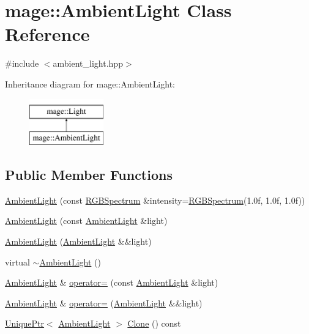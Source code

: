\hypertarget{classmage_1_1_ambient_light}{}\section{mage\+:\+:Ambient\+Light Class Reference}
\label{classmage_1_1_ambient_light}


{\ttfamily \#include $<$ambient\+\_\+light.\+hpp$>$}

Inheritance diagram for mage\+:\+:Ambient\+Light\+:\begin{figure}[H]
\begin{center}
\leavevmode
\includegraphics[height=2.000000cm]{classmage_1_1_ambient_light}
\end{center}
\end{figure}
\subsection*{Public Member Functions}
\begin{DoxyCompactItemize}
\item 
\hyperlink{classmage_1_1_ambient_light_a4ae1590d03ca4e9d854bb6ef650ee126}{Ambient\+Light} (const \hyperlink{structmage_1_1_r_g_b_spectrum}{R\+G\+B\+Spectrum} \&intensity=\hyperlink{structmage_1_1_r_g_b_spectrum}{R\+G\+B\+Spectrum}(1.\+0f, 1.\+0f, 1.\+0f))
\item 
\hyperlink{classmage_1_1_ambient_light_ac5295d1f90e64d3e59ff2856df32a187}{Ambient\+Light} (const \hyperlink{classmage_1_1_ambient_light}{Ambient\+Light} \&light)
\item 
\hyperlink{classmage_1_1_ambient_light_aab4919587032054d28ec15cf5639ad48}{Ambient\+Light} (\hyperlink{classmage_1_1_ambient_light}{Ambient\+Light} \&\&light)
\item 
virtual \hyperlink{classmage_1_1_ambient_light_a511bb794b11f112e750da09f4044e7db}{$\sim$\+Ambient\+Light} ()
\item 
\hyperlink{classmage_1_1_ambient_light}{Ambient\+Light} \& \hyperlink{classmage_1_1_ambient_light_aa8bbeaca08a626b6b5f5447a847724cc}{operator=} (const \hyperlink{classmage_1_1_ambient_light}{Ambient\+Light} \&light)
\item 
\hyperlink{classmage_1_1_ambient_light}{Ambient\+Light} \& \hyperlink{classmage_1_1_ambient_light_ae54bf8695957fb438e162a913725922a}{operator=} (\hyperlink{classmage_1_1_ambient_light}{Ambient\+Light} \&\&light)
\item 
\hyperlink{namespacemage_a3316d7143a973e37adf1110f2e80ca31}{Unique\+Ptr}$<$ \hyperlink{classmage_1_1_ambient_light}{Ambient\+Light} $>$ \hyperlink{classmage_1_1_ambient_light_a542a68882bc0807cf5f9a37391b9f44e}{Clone} () const
\end{DoxyCompactItemize}
